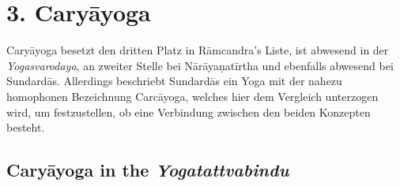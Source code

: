 
\section{3. Caryāyoga}
\label{caryayogaintro}

Caryāyoga besetzt den dritten Platz in Rāmcandra's Liste, ist abwesend in der \textit{Yogasvarodaya}, an zweiter Stelle bei Nārāyaṇatīrtha und ebenfalls abwesend bei Sundardās. Allerdings beschriebt Sundardās ein Yoga mit der nahezu homophonen Bezeichnung Carcāyoga, welches hier dem Vergleich unterzogen wird, um festzustellen, ob eine Verbindung zwischen den beiden Konzepten besteht.

\subsection{Caryāyoga in the \textit{Yogatattvabindu}}

